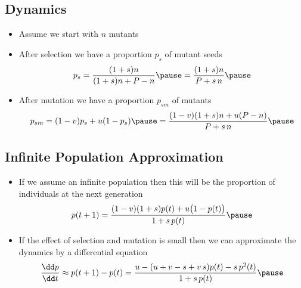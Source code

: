 
\begin{slide}
\section[-0.5]{Dynamics}

\begin{PauseHighLight}
  \begin{itemize}
  \item Assume we start with $n$ mutants\pause
  \item After selection we have a proportion $p_s$ of mutant seeds
    \begin{align*}
      p_s = \frac{(1+s)n}{(1+s)n + P-n}\pause = \frac{(1+s)n}{P+s\,n}\pause
    \end{align*}
  \item After mutation we have a proportion $p_{sm}$ of mutants
    \begin{align*}
      p_{sm} = (1-v) p_s + u (1-p_s)\pause = \frac{(1-v)(1+s)n +
        u(P-n)}{P+s\,n}\pause
    \end{align*}
  \end{itemize}
\end{PauseHighLight}

\end{slide}


\begin{slide}
\section{Infinite Population Approximation}

\begin{PauseHighLight}
  \begin{itemize}
  \item If we assume an infinite population then this will be the
    proportion of individuals at the next generation
    \begin{align*}
      p(t+1) = \frac{(1-v)(1+s) p(t) +
        u\bigl(1-p(t)\bigr)}{1+s\,p(t)}\pause
    \end{align*}
  \item If the effect of selection and mutation is small then we can
    approximate the dynamics by a differential equation
    \begin{align*}
      \frac{\dd p}{\dd t} \approx p(t+1) - p(t) = 
      \frac{u - (u+v-s+v\,s) p(t) - s\, p^2(t)}{1+s\,p(t)}\pause
    \end{align*}
  \end{itemize}
\end{PauseHighLight}

\end{slide}

